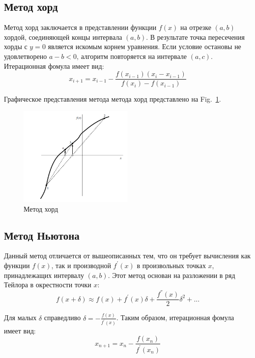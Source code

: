 \documentclass[
11pt,%
tightenlines,%
twoside,%
onecolumn,%
nofloats,%
nobibnotes,%
nofootinbib,%
superscriptaddress,%
noshowpacs,%
centertags]%
{revtex4}
\begin{document}
\subsection{Метод хорд}
Метод хорд заключается в представлении функции $f(x)$ на отрезке $(a,b)$ хордой, соединяющей концы интервала $(a,b)$. В результате точка пересечения хорды с $y=0$ является искомым корнем уравнения. Если условие остановы не удовлетворено $a-b<0$, алгоритм повторяется на интервале $(a,c)$. 
Итерационная фомула имеет вид:
\begin{equation}
x_{i+1}=x_{i-1}-\frac{f(x_{i-1})(x_i-x_{i-1})}{f(x_i)-f(x_{i-1})}
\end{equation}


Графическое представления метода метода хорд представлено на Fig.~\ref{fig:chords}.

\begin{figure}[h]
\setcaptionmargin{5mm}
\onelinecaptionstrue
\includegraphics[width=0.5\textwidth]{pics/chords.png}
\caption{Метод хорд}\label{fig:chords}
\end{figure}

\subsection{Метод Ньютона}
Данный метод отличается от вышеописанных тем, что он требует вычисления как функции $f(x)$, так и производной $f^{'}(x)$ в произвольных точках $x$, принадлежащих интервалу $(a,b )$. Этот метод основан на разложении в ряд Тейлора в окрестности точки $x$:
\begin{equation}
f(x+\delta) \approx f(x)+f^{'}(x)\delta+\frac{f^{''}(x)}{2}\delta^2+ ...
\end{equation}

Для малых $\delta$ справедливо $\delta=-\frac{f(x)}{f^{'}(x)}$.
Таким образом, итерационная фомула имеет вид:
\begin{equation}
x_{n+1}=x_n-\frac{f(x_n)}{f^{'}(x_n)}
\end{equation}
\end{document}
